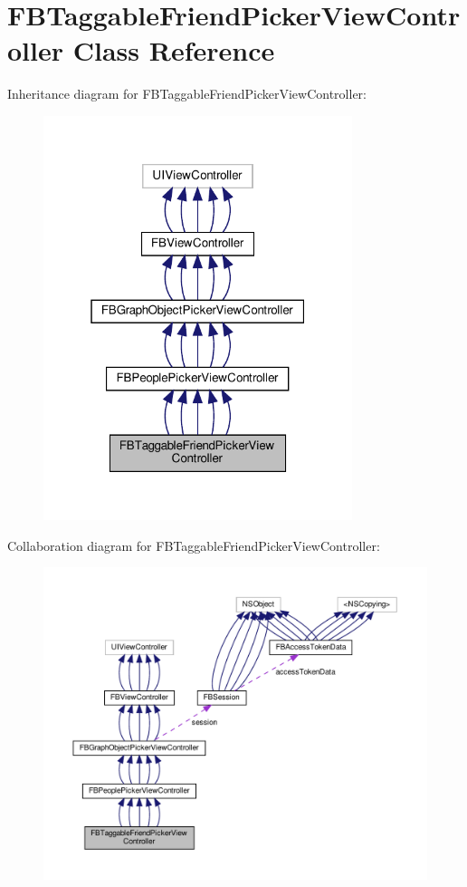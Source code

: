 \hypertarget{interfaceFBTaggableFriendPickerViewController}{}\section{F\+B\+Taggable\+Friend\+Picker\+View\+Controller Class Reference}
\label{interfaceFBTaggableFriendPickerViewController}


Inheritance diagram for F\+B\+Taggable\+Friend\+Picker\+View\+Controller\+:
\nopagebreak
\begin{figure}[H]
\begin{center}
\leavevmode
\includegraphics[width=256pt]{interfaceFBTaggableFriendPickerViewController__inherit__graph}
\end{center}
\end{figure}


Collaboration diagram for F\+B\+Taggable\+Friend\+Picker\+View\+Controller\+:
\nopagebreak
\begin{figure}[H]
\begin{center}
\leavevmode
\includegraphics[width=350pt]{interfaceFBTaggableFriendPickerViewController__coll__graph}
\end{center}
\end{figure}
